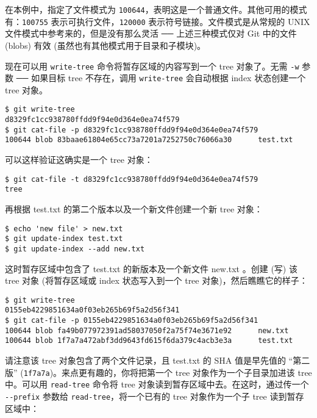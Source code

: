 \documentclass[a4paper]{book}
\begin{document}
在本例中，指定了文件模式为 \texttt{100644}，表明这是一个普通文件。其他可用的模式有：\texttt{100755} 表示可执行文件，\texttt{120000} 表示符号链接。文件模式是从常规的 UNIX 文件模式中参考来的，但是没有那么灵活 ── 上述三种模式仅对 Git 中的文件 (blobs) 有效 (虽然也有其他模式用于目录和子模块)。

现在可以用 \texttt{write-tree} 命令将暂存区域的内容写到一个 tree 对象了。无需 \texttt{-w} 参数 ── 如果目标 tree 不存在，调用 \texttt{write-tree} 会自动根据 index 状态创建一个 tree 对象。

\begin{shaded}\begin{verbatim}
$ git write-tree
d8329fc1cc938780ffdd9f94e0d364e0ea74f579
$ git cat-file -p d8329fc1cc938780ffdd9f94e0d364e0ea74f579
100644 blob 83baae61804e65cc73a7201a7252750c76066a30      test.txt
\end{verbatim}\end{shaded}

可以这样验证这确实是一个 tree 对象：

\begin{shaded}\begin{verbatim}
$ git cat-file -t d8329fc1cc938780ffdd9f94e0d364e0ea74f579
tree
\end{verbatim}\end{shaded}

再根据 test.txt 的第二个版本以及一个新文件创建一个新 tree 对象：

\begin{shaded}\begin{verbatim}
$ echo 'new file' > new.txt
$ git update-index test.txt
$ git update-index --add new.txt
\end{verbatim}\end{shaded}

这时暂存区域中包含了 test.txt 的新版本及一个新文件 new.txt 。创建 (写) 该 tree 对象 (将暂存区域或 index 状态写入到一个 tree 对象)，然后瞧瞧它的样子：

\begin{shaded}\begin{verbatim}
$ git write-tree
0155eb4229851634a0f03eb265b69f5a2d56f341
$ git cat-file -p 0155eb4229851634a0f03eb265b69f5a2d56f341
100644 blob fa49b077972391ad58037050f2a75f74e3671e92      new.txt
100644 blob 1f7a7a472abf3dd9643fd615f6da379c4acb3e3a      test.txt
\end{verbatim}\end{shaded}

请注意该 tree 对象包含了两个文件记录，且 test.txt 的 SHA 值是早先值的 “第二版” (\texttt{1f7a7a})。来点更有趣的，你将把第一个 tree 对象作为一个子目录加进该 tree 中。可以用 \texttt{read-tree} 命令将 tree 对象读到暂存区域中去。在这时，通过传一个 \texttt{-{}-prefix} 参数给 \texttt{read-tree}，将一个已有的 tree 对象作为一个子 tree 读到暂存区域中：
\end{document}

